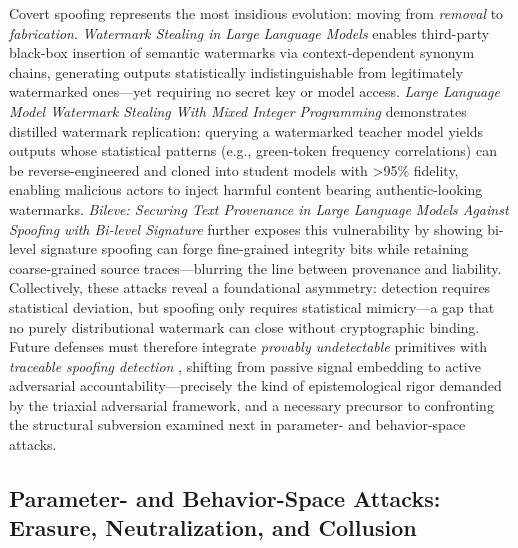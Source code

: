 \documentclass[11pt,a4paper]{article}
\begin{document}
Covert spoofing represents the most insidious evolution: moving from \emph{removal} to \emph{fabrication}. \emph{Watermark Stealing in Large Language Models} \cite{arxiv:2402.19361} enables third-party black-box insertion of semantic watermarks via context-dependent synonym chains, generating outputs statistically indistinguishable from legitimately watermarked ones---yet requiring no secret key or model access. \emph{Large Language Model Watermark Stealing With Mixed Integer Programming} \cite{arxiv:2405.19677} demonstrates distilled watermark replication: querying a watermarked teacher model yields outputs whose statistical patterns (e.g., green-token frequency correlations) can be reverse-engineered and cloned into student models with >95\% fidelity, enabling malicious actors to inject harmful content bearing authentic-looking watermarks. \emph{Bileve: Securing Text Provenance in Large Language Models Against Spoofing with Bi-level Signature} \cite{arxiv:2406.01946} further exposes this vulnerability by showing bi-level signature spoofing can forge fine-grained integrity bits while retaining coarse-grained source traces---blurring the line between provenance and liability. Collectively, these attacks reveal a foundational asymmetry: detection requires statistical deviation, but spoofing only requires statistical mimicry---a gap that no purely distributional watermark can close without cryptographic binding. Future defenses must therefore integrate \emph{provably undetectable} primitives \cite{arxiv:2306.09194} with \emph{traceable spoofing detection} \cite{arxiv:2402.19361}, shifting from passive signal embedding to active adversarial accountability---precisely the kind of epistemological rigor demanded by the triaxial adversarial framework, and a necessary precursor to confronting the structural subversion examined next in parameter- and behavior-space attacks.


\subsection{Parameter- and Behavior-Space Attacks: Erasure, Neutralization, and Collusion}
\end{document}
